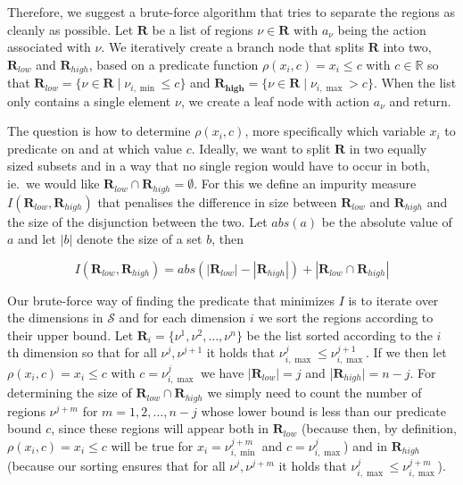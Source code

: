 Therefore, we suggest a brute-force algorithm that tries to separate the regions
as cleanly as possible. Let $\mathbf{R}$ be a list of regions $\nu \in
\mathbf{R}$ with $a_{\nu}$ being the action associated with $\nu$. We
iteratively create a branch node that splits $\mathbf{R}$ into two,
$\mathbf{R}_{low}$ and $\mathbf{R}_{high}$, based on a predicate function
$\rho(x_i,c) = x_i \le c$ with $c \in \mathbb{R}$ so that $\mathbf{R}_{low} = \{
\nu \in \mathbf{R} \mid \nu_{i,\min} \le c \}$ and $\mathbf{R_{high}} = \{ \nu
\in \mathbf{R} \mid \nu_{i,\max} > c \}$. When the list only contains a single
element $\nu$, we create a leaf node with action $a_{\nu}$ and return.

The question is how to determine $\rho(x_i,c)$, more specifically which variable
$x_i$ to predicate on and at which value $c$. Ideally, we want to split
$\mathbf{R}$ in two equally sized subsets and in a way that no single region
would have to occur in both, ie.\ we would like $\mathbf{R}_{low} \cap
\mathbf{R}_{high} = \emptyset$. For this we define an impurity measure
$I(\mathbf{R}_{low},\mathbf{R}_{high})$ that penalises the difference in size
between $\mathbf{R}_{low}$ and $\mathbf{R}_{high}$ and the size of the
disjunction between the two. Let $abs(a)$ be the absolute value of $a$ and let
$|b|$ denote the size of a set $b$, then

\[
    I(\mathbf{R}_{low}, \mathbf{R}_{high})  = abs(|\mathbf{R}_{low}| -
    |\mathbf{R}_{high}|) + |\mathbf{R}_{low} \cap \mathbf{R}_{high}|
\]


Our brute-force way of finding the predicate that minimizes $I$ is to iterate
over the dimensions in $\mathcal{S}$ and for each dimension $i$ we sort the
regions according to their upper bound. Let $\mathbf{R}_i = \{ \nu^1, \nu^2,
\ldots, \nu^n \}$ be the list sorted according to the $i$ th dimension so that
for all $\nu^j, \nu^{j+1}$ it holds that $\nu^{j}_{i,\max} \le
\nu^{j+1}_{i,\max}$. If we then let $\rho(x_i,c) = x_i \le c$ with $c =
\nu^{j}_{i,\max}$ we have $|\mathbf{R}_{low}| = j$ and |$\mathbf{R}_{high}| = n
- j$. For determining the size of $\mathbf{R}_{low} \cap \mathbf{R}_{high}$ we
simply need to count the number of regions $\nu^{j+m}$ for $m = 1, 2, \ldots,
n-j$ whose lower bound is less than our predicate bound $c$, since these regions
will appear both in $\mathbf{R}_{low}$ (because then, by definition, $\rho(x_i,c) = x_i
\le c$ will be true for $x_i = \nu^{j+m}_{i,\min}$ and $c = \nu^{j}_{i,\max}$)
and in $\mathbf{R}_{high}$ (because our sorting ensures that for all
$\nu^{j},\nu^{j+m}$ it holds that $\nu^{j}_{i,\max} \le \nu^{j+m}_{i,\max}$).

